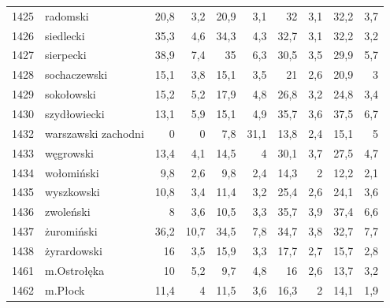 \begin{center}
\begin{longtable}{lp{3cm}rrrrrrrr}
1425 & radomski                & 20,8    & 3,2         & 20,9     & 3,1          & 32       & 3,1          & 32,2     & 3,7          \\
1426 & siedlecki               & 35,3    & 4,6         & 34,3     & 4,3          & 32,7     & 3,1          & 32,2     & 3,2          \\
1427 & sierpecki               & 38,9    & 7,4         & 35       & 6,3          & 30,5     & 3,5          & 29,9     & 5,7          \\
1428 & sochaczewski            & 15,1    & 3,8         & 15,1     & 3,5          & 21       & 2,6          & 20,9     & 3            \\
1429 & sokołowski              & 15,2    & 5,2         & 17,9     & 4,8          & 26,8     & 3,2          & 24,8     & 3,4          \\
1430 & szydłowiecki            & 13,1    & 5,9         & 15,1     & 4,9          & 35,7     & 3,6          & 37,5     & 6,7          \\
1432 & warszawski zachodni     & 0       & 0           & 7,8      & 31,1         & 13,8     & 2,4          & 15,1     & 5            \\
1433 & węgrowski               & 13,4    & 4,1         & 14,5     & 4            & 30,1     & 3,7          & 27,5     & 4,7          \\
1434 & wołomiński              & 9,8     & 2,6         & 9,8      & 2,4          & 14,3     & 2            & 12,2     & 2,1          \\
1435 & wyszkowski              & 10,8    & 3,4         & 11,4     & 3,2          & 25,4     & 2,6          & 24,1     & 3,6          \\
1436 & zwoleński               & 8       & 3,6         & 10,5     & 3,3          & 35,7     & 3,9          & 37,4     & 6,6          \\
1437 & żuromiński              & 36,2    & 10,7        & 34,5     & 7,8          & 34,7     & 3,8          & 32,7     & 7,7          \\
1438 & żyrardowski             & 16      & 3,5         & 15,9     & 3,3          & 17,7     & 2,7          & 15,7     & 2,8          \\
1461 & m.Ostrołęka             & 10      & 5,2         & 9,7      & 4,8          & 16       & 2,6          & 13,7     & 3,2          \\
1462 & m.Płock                 & 11,4    & 4           & 11,5     & 3,6          & 16,3     & 2            & 14,1     & 1,9          \\

\end{longtable}
\end{center}
